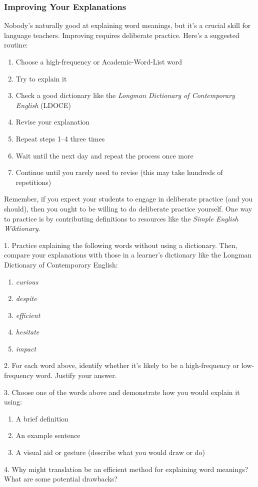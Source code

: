 \subsubsection{Improving Your Explanations}

Nobody's naturally good at explaining word meanings, but it's a crucial skill for language teachers. Improving requires deliberate practice. Here's a suggested routine:

\begin{enumerate}
    \item Choose a high-frequency or Academic-Word-List word
    \item Try to explain it
    \item Check a good dictionary like the \textit{Longman Dictionary of Contemporary English} (LDOCE)
    \item Revise your explanation
    \item Repeat steps 1--4 three times
    \item Wait until the next day and repeat the process once more
    \item Continue until you rarely need to revise (this may take hundreds of repetitions)
\end{enumerate}

Remember, if you expect your students to engage in deliberate practice (and you should), then you ought to be willing to do deliberate practice yourself. One way to practice is by contributing definitions to resources like the \textit{Simple English Wiktionary}.


\begin{tcolorbox}[title=Exercise: Explaining Word Meanings, colback=white, colframe=green!75!black, fonttitle=\bfseries]
1. Practice explaining the following words without using a dictionary. Then, compare your explanations with those in a learner's dictionary like the Longman Dictionary of Contemporary English:

\begin{enumerate}
   \item \textit{curious}
   \item \textit{despite}
   \item \textit{efficient}
   \item \textit{hesitate}
   \item \textit{impact}
\end{enumerate}

2. For each word above, identify whether it's likely to be a high-frequency or low-frequency word. Justify your answer.

3. Choose one of the words above and demonstrate how you would explain it using:
   \begin{enumerate}
      \item A brief definition
      \item An example sentence
      \item A visual aid or gesture (describe what you would draw or do)
   \end{enumerate}

4. Why might translation be an efficient method for explaining word meanings? What are some potential drawbacks?
\end{tcolorbox}


